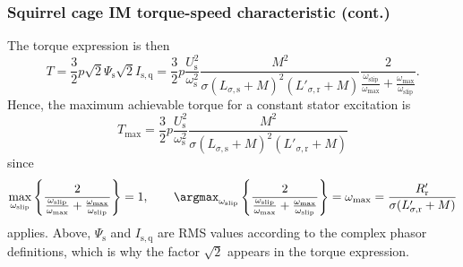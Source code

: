 \begin{frame}
	\frametitle{Squirrel cage IM torque-speed characteristic (cont.)} 
    The torque expression is then
    \begin{equation}
            T = \frac{3}{2} p \sqrt{2}\Psi_\mathrm{s} \sqrt{2}I_\mathrm{s,q} = \frac{3}{2} p \frac{U_\mathrm{s}^2}{\omega_\mathrm{s}^2}\frac{M^2}{\sigma (L_{\sigma,\mathrm{s}} +M)^2(L'_{\sigma,\mathrm{r}} +M)}\frac{2}{\frac{\omega_\mathrm{slip}}{\omega_\mathrm{max}} + \frac{\omega_\mathrm{max}}{\omega_\mathrm{slip}}}.
    \end{equation}
    \pause
    Hence, the maximum achievable torque for a constant stator excitation is
    \begin{equation}
        T_\mathrm{max} = \frac{3}{2} p \frac{U_\mathrm{s}^2}{\omega_\mathrm{s}^2}\frac{M^2}{\sigma (L_{\sigma,\mathrm{s}} +M)^2(L'_{\sigma,\mathrm{r}} +M)}
    \end{equation}
    \pause
    since 
    $$ \max_{\omega_{\mathrm{slip}}} \left\{\frac{2}{\frac{\omega_\mathrm{slip}}{\omega_\mathrm{max}} + \frac{\omega_\mathrm{max}}{\omega_\mathrm{slip}}}\right\} = 1, \qquad \argmax_{\omega_{\mathrm{slip}}} \left\{\frac{2}{\frac{\omega_\mathrm{slip}}{\omega_\mathrm{max}} + \frac{\omega_\mathrm{max}}{\omega_\mathrm{slip}}}\right\} = \omega_\mathrm{max}=\frac{R'_\mathrm{r}}{\sigma (L'_{\sigma,\mathrm{r}} +M)}$$ 
    applies. \pause Above, $\Psi_\mathrm{s}$ and $I_\mathrm{s,q}$ are RMS values according to the complex phasor definitions, which is why the factor $\sqrt{2}$ appears in the torque expression.
\end{frame}

